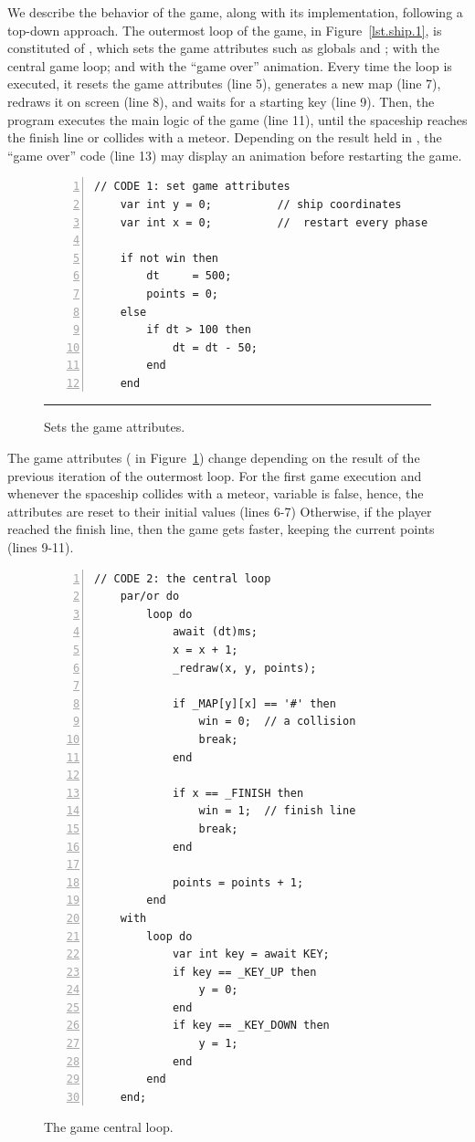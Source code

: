 We describe the behavior of the game, along with its implementation, following 
a top-down approach.
The outermost loop of the game, in Figure~\ref{lst.ship.1}, is constituted of 
, which sets the game attributes such as globals  and 
;  with the central game loop; and  with the 
``game over'' animation.
%
Every time the loop is executed, it resets the game attributes (line 5), 
generates a new map (line 7), redraws it on screen (line 8), and waits for a 
starting key (line 9).
Then, the program executes the main logic of the game (line 11), until the 
spaceship reaches the finish line or collides with a meteor.
Depending on the result held in , the ``game over'' code (line 13) 
may display an animation before restarting the game.

\begin{figure}[ht]
\begin{lstlisting}[numbers=left,xleftmargin=2em]
    // CODE 1: set game attributes
    var int y = 0;          // ship coordinates
    var int x = 0;          //  restart every phase

    if not win then
        dt     = 500;
        points = 0;
    else
        if dt > 100 then
            dt = dt - 50;
        end
    end
\end{lstlisting}
\rule{14cm}{0.37pt}
\caption{ Sets the game attributes.
{\small %
}%
\label{lst.ship.2}
}
\end{figure}

The game attributes ( in Figure~\ref{lst.ship.2}) change depending 
on the result of the previous iteration of the outermost loop.
%
For the first game execution and whenever the spaceship collides with a meteor, 
variable  is false, hence, the attributes are reset to their initial 
values (lines 6-7)
Otherwise, if the player reached the finish line, then the game gets faster, 
keeping the current points (lines 9-11).

\begin{figure}[ht]
\begin{lstlisting}[numbers=left,xleftmargin=2em]
    // CODE 2: the central loop
    par/or do
        loop do
            await (dt)ms;
            x = x + 1;
            _redraw(x, y, points);

            if _MAP[y][x] == '#' then
                win = 0;  // a collision
                break;
            end

            if x == _FINISH then
                win = 1;  // finish line
                break;
            end

            points = points + 1;
        end
    with
        loop do
            var int key = await KEY;
            if key == _KEY_UP then
                y = 0;
            end
            if key == _KEY_DOWN then
                y = 1;
            end
        end
    end;
\end{lstlisting}
\caption{ The game central loop.
{\small %
}%
\label{lst.ship.3}
}
\end{figure}

